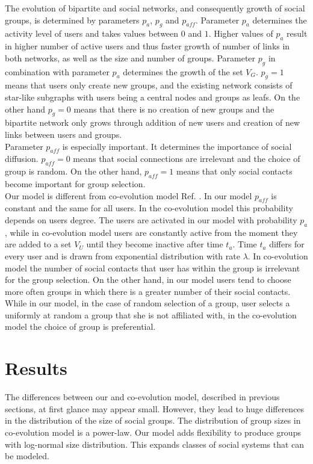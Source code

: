 The evolution of bipartite and social networks, and consequently growth of social groups, is determined by parameters $p_{a}$, $p_{g}$ and $p_{aff}$. Parameter $p_{a}$ determines the activity level of users and takes values between $0$ and $1$. Higher values of $p_{a}$ result in higher number of active users and thus faster growth of number of links in both networks, as well as the size and number of groups. Parameter $p_{g}$ in combination with parameter $p_{a}$ determines the growth of the set $V_{G}$. $p_{g}=1$ means that users only create new groups, and the existing network consists of star-like subgraphs with users being a central nodes and groups as leafs. On the other hand $p_{g}=0$ means that there is no creation of new groups and the bipartite network only grows through addition of new users and creation of new links between users and groups.\\
Parameter $p_{aff}$ is especially important. It determines the importance of social diffusion. $p_{aff}=0$ means that social connections are irrelevant and the choice of group is random. On the other hand, $p_{aff}=1$ means that only social contacts become important for group selection.\\ 
Our model is different from co-evolution model Ref. \cite{zheleva2009co}. In our model $p_{aff}$ is constant and the same for all users. In the co-evolution model this probability depends on users degree. The users are activated in our model with probability $p_{a}$, while in co-evolution model users are constantly active from the moment they are added to a set $V_{U}$ until they become inactive after time $t_{a}$. Time $t_{a}$ differs for every user and is drawn from exponential distribution with rate $\lambda$. In co-evolution model the number of social contacts that user has within the group is irrelevant for the group selection. On the other hand, in our model users tend to choose more often groups in which there is a greater number of their social contacts. While in our model, in the case of random selection of a group, user selects a uniformly at random a group that she is not affiliated with, in the co-evolution model the choice of group is preferential.\\

\section{Results \label{sec:results}}

The differences between our and co-evolution model, described in previous sections, at first glance may appear small. However, they lead to huge differences in the distribution of the size of social groups. The distribution of group sizes in co-evolution model is a power-law. 
Our model adds flexibility to produce groups with log-normal size distribution. This expands classes of social systems that can be modeled. 

